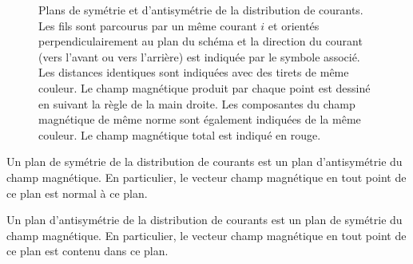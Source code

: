 \documentclass[11pt,fleqn]{book} %
\begin{document}
\begin{figure}[htbp]
    
    \caption{Plans de symétrie et d'antisymétrie de la distribution de courants. Les fils sont parcourus par un même courant $i$ et orientés perpendiculairement au plan du schéma et la direction du courant (vers l'avant ou vers l'arrière) est indiquée par le symbole associé. Les distances identiques sont indiquées avec des tirets de même couleur. Le champ magnétique produit par chaque point est dessiné en suivant la règle de la main droite. Les composantes du champ magnétique de même norme sont également indiquées de la même couleur. Le champ magnétique total est indiqué en rouge.}
    \label{fig:plans_symetrie}
\end{figure}

\begin{proposition}
    Un plan de symétrie de la distribution de courants est un plan d'antisymétrie du champ magnétique. En particulier, le vecteur champ magnétique en tout point de ce plan est normal à ce plan.
\end{proposition}

\begin{proposition}
    Un plan d'antisymétrie de la distribution de courants est un plan de symétrie du champ magnétique. En particulier, le vecteur champ magnétique en tout point de ce plan est contenu dans ce plan.
\end{proposition}
\end{document}
